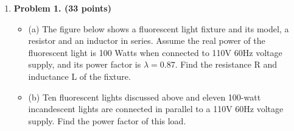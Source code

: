 \begin{enumerate}

\item {\bf Problem 1. (33 points)} 

\begin{itemize}
\item (a) The figure below shows a fluorescent light fixture and 
its model, a resistor and an inductor in series. Assume the real power
of the fluorescent light is 100 Watts when connected to 110V 60Hz voltage
supply, and its power factor is $\lambda=0.87$. Find the resistance 
R and inductance L of the fixture.

\item (b) Ten fluorescent lights discussed above and eleven
100-watt incandescent lights are connected in parallel to a 110V 60Hz
voltage supply. Find the power factor of this load.
\end{itemize}






\end{enumerate}

